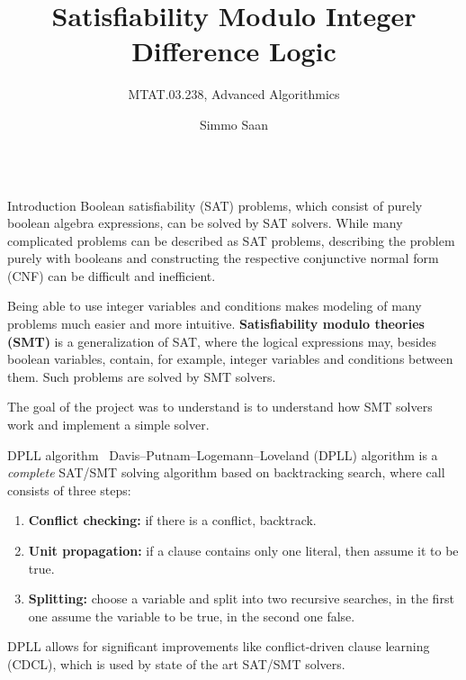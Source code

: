 \documentclass{beamer}
\title{Satisfiability Modulo Integer Difference Logic}
\subtitle{MTAT.03.238, Advanced Algorithmics}
\author{Simmo Saan}
\institute{Institute of Computer Science, University of Tartu}
\date{}
\begin{document}

\begin{frame}[fragile,t]
\maketitle

\begin{columns}[t,onlytextwidth]
	\begin{column}{0.485\textwidth}
		\begin{block}{Introduction}
			Boolean satisfiability (SAT) problems, which consist of purely boolean algebra expressions, can be solved by SAT solvers. While many complicated problems can be described as SAT problems, describing the problem purely with booleans and constructing the respective conjunctive normal form (CNF) can be difficult and inefficient.

			Being able to use integer variables and conditions makes modeling of many problems much easier and more intuitive. \textbf{Satisfiability modulo theories (SMT)} is a generalization of SAT, where the logical expressions may, besides boolean variables, contain, for example, integer variables and conditions between them. Such problems are solved by SMT solvers.

			The goal of the project was to understand is to understand how SMT solvers work and implement a simple solver.
		\end{block}
	
		\begin{block}{DPLL algorithm~\cite{DPLLmethod}}
			Davis–Putnam–Logemann–Loveland (DPLL) algorithm is a \emph{complete} SAT/SMT solving algorithm based on backtracking search, where call consists of three steps:
			\begin{enumerate}
				\item \textbf{Conflict checking:} if there is a conflict, backtrack.
				\item \textbf{Unit propagation:} if a clause contains only one literal, then assume it to be true.
				\item \textbf{Splitting:} choose a variable and split into two recursive searches, in the first one assume the variable to be true, in the second one false.
			\end{enumerate}
		
			DPLL allows for significant improvements like conflict-driven clause learning (CDCL), which is used by state of the art SAT/SMT solvers.
		\end{block}
	

\end{column}
\end{columns}
\end{frame}
\end{document}
